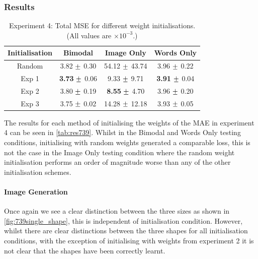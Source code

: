 \subsubsection{Results}

\begin{table}[h!]
\centering
	\begin{tabular}{|c|c|c|c|}
	\hline
	\textbf{Initialisation} & 	\textbf{Bimodal} & 	\textbf{Image Only} 	& 	\textbf{Words Only} \\ \hline
Random 	&	3.82	$\mypm$	0.30	&	54.12	$\mypm$	43.74	&	3.96	$\mypm$	0.22	\\ \hline
Exp 1	&	\textbf{3.73}	$\mypm$	0.06	&	9.33	$\mypm$	9.71	&	\textbf{3.91}	$\mypm$	0.04\\ \hline
Exp 2	&	3.80	$\mypm$	0.19	&	\textbf{8.55}	$\mypm$	4.70	&	3.96	$\mypm$	0.20	\\ \hline
Exp 3	&	3.75	$\mypm$	0.02	&	14.28	$\mypm$	12.18	&	3.93	$\mypm$	0.05	\\ \hline

	\end{tabular}
\caption{Experiment 4: Total MSE for different weight initialisations. (All values are $\times10^{-3}$.)}
\label{tab:res739}
\end{table}

The results for each method of initialising the weights of the \ac{MAE} in experiment 4 can be seen in \autoref{tab:res739}. Whilst in the Bimodal and Words Only testing conditions, initialising with random weights generated a comparable loss, this is not the case in the Image Only testing condition where the random weight initialisation performs an order of magnitude worse than any of the other initialisation schemes.


\paragraph{Image Generation}

Once again we see a clear distinction between the three sizes as shown in \autoref{fig:739single_shape}, this is independent of initialisation condition. However, whilst there are clear distinctions between the three shapes for all initialisation conditions, with the exception of initialising with weights from experiment 2 it is not clear that the shapes have been correctly learnt.

